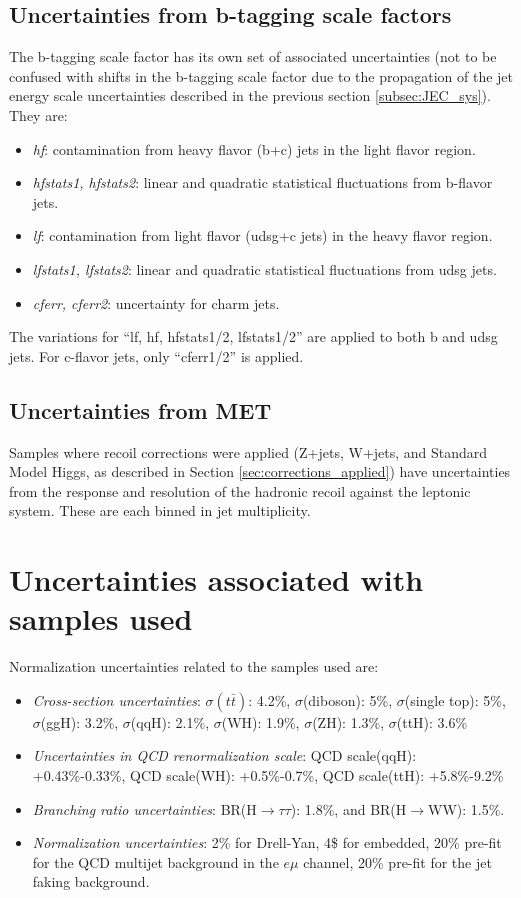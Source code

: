 \subsection{Uncertainties from b-tagging scale factors}
The b-tagging scale factor has its own set of associated uncertainties (not to be confused with shifts in the b-tagging scale factor due to the propagation of the jet energy scale uncertainties described in the previous section \ref{subsec:JEC_sys}). They are:
\begin{itemize}
    \item \textit{hf}: contamination from heavy flavor (b+c) jets in the light flavor region.
    \item \textit{hfstats1, hfstats2}: linear and quadratic statistical fluctuations from b-flavor jets. 
    \item \textit{lf}: contamination from light flavor (udsg+c jets) in the heavy flavor region.
    \item \textit{lfstats1, lfstats2}: linear and quadratic statistical fluctuations from udsg jets.
    \item \textit{cferr, cferr2}: uncertainty for charm jets.
\end{itemize}
The variations for ``lf, hf, hfstats1/2, lfstats1/2'' are applied to both b and udsg jets. For c-flavor jets, only ``cferr1/2'' is applied.

\subsection{Uncertainties from MET}
Samples where recoil corrections were applied (Z+jets, W+jets, and Standard Model Higgs, as described in Section \ref{sec:corrections_applied}) have uncertainties from the response and resolution of the hadronic recoil against the leptonic system. These are each binned in jet multiplicity.

\section{Uncertainties associated with samples used}
Normalization uncertainties related to the samples used are:
\begin{itemize}
    \item \textit{Cross-section uncertainties}: $\sigma(t\bar{t})$: 4.2\%, $\sigma$(diboson): 5\%,  $\sigma$(single top): 5\%, $\sigma$(ggH): 3.2\%, $\sigma$(qqH): 2.1\%, $\sigma$(WH): 1.9\%, $\sigma$(ZH): 1.3\%, $\sigma$(ttH): 3.6\%
    \item \textit{Uncertainties in QCD renormalization scale}: QCD scale(qqH): +0.43\%-0.33\%, QCD scale(WH): +0.5\%-0.7\%, QCD scale(ttH): +5.8\%-9.2\%
    \item \textit{Branching ratio uncertainties}: BR(H$\rightarrow\tau\tau$): 1.8\%, and BR(H$\rightarrow$WW): 1.5\%.
    \item \textit{Normalization uncertainties}: 2\% for Drell-Yan, 4\$ for embedded, 20\% pre-fit for the QCD multijet background in the $e\mu$ channel, 20\% pre-fit for the jet faking background.
\end{itemize}

